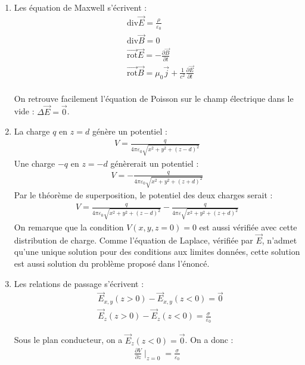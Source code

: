 \begin{correction}

\begin{enumerate}

	\item Les équation de Maxwell s'écrivent :
	\begin{align*}
		& \mathrm{div}\vec{E}=\frac{\rho}{\varepsilon_0} \\
		& \mathrm{div}\vec{B}=0 \\
		& \vec{\mathrm{rot}}\vec{E}=-\frac{\partial\vec{B}}{\partial t} \\
		& \vec{\mathrm{rot}}\vec{B}=\mu_0\vec{j}+\frac{1}{c^2}\frac{\partial\vec{E}}{\partial t} \\
	\end{align*}
	
	On retrouve facilement l'équation de Poisson sur le champ électrique dans le vide : $\Delta \vec{E}=\vec{0}$.
	
	\item La charge $q$ en $z=d$ génère un potentiel :
	\begin{align*}
		V=\frac{q}{4\pi\varepsilon_0 \sqrt{x^2+y^2+(z-d)^2}}
	\end{align*}
	Une charge $-q$ en $z=-d$ génèrerait un potentiel :
	\begin{align*}
		V=-\frac{q}{4\pi\varepsilon_0 \sqrt{x^2+y^2+(z+d)^2}}
	\end{align*}	
	Par le théorème de superposition, le potentiel des deux charges serait :
	\begin{align*}
		V=\frac{q}{4\pi\varepsilon_0 \sqrt{x^2+y^2+(z-d)^2}}-\frac{q}{4\pi\varepsilon \sqrt{x^2+y^2+(z+d)^2}}
	\end{align*}
	On remarque que la condition $V(x,y,z=0)=0$ est aussi vérifiée avec cette distribution de charge. Comme l'équation de Laplace, vérifiée par $\vec{E}$, n'admet qu'une unique solution pour des conditions aux limites données, cette solution est aussi solution du problème proposé dans l'énoncé. 
	
	\item Les relations de passage s'écrivent :
	\begin{align*}
		&\vec{E}_{x,y}(z>0)-\vec{E}_{x,y}(z<0)=\vec{0} \\
		&\vec{E}_{z}(z>0)-\vec{E}_{z}(z<0)=\frac{\sigma}{\varepsilon_0}
	\end{align*}
	
	Sous le plan conducteur, on a $\vec{E}_{z}(z<0)=\vec{0}$. On a donc :
	\begin{align*}
		\frac{\partial V}{\partial z}\mid_{z=0}=\frac{\sigma}{\varepsilon_0}
	\end{align*}
	

\end{enumerate}
\end{correction}

